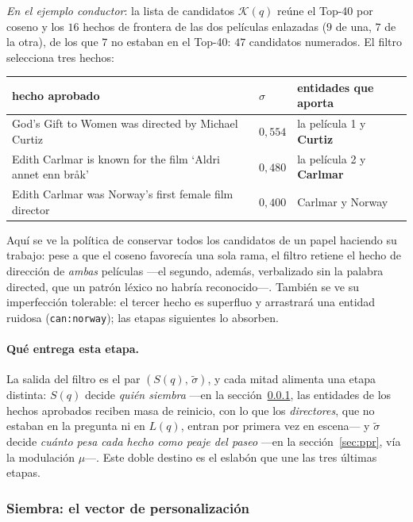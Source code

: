 \documentclass[11pt,a4paper]{article}
\begin{document}
\emph{En el ejemplo conductor}: la lista de candidatos $\mathcal{K}(q)$
reúne el Top-40 por coseno y los $16$ hechos de frontera de las dos
películas enlazadas ($9$ de una, $7$ de la otra), de los que $7$ no
estaban en el Top-40: $47$ candidatos numerados. El filtro selecciona
tres hechos:
\begin{center}\small
\begin{tabular}{lll}
\toprule
hecho aprobado & $\sigma$ & entidades que aporta\\
\midrule
\guillemotleft{}God's Gift to Women was directed by Michael Curtiz\guillemotright{} & $0{,}554$ &
  la película 1 y \textbf{Curtiz}\\
\guillemotleft{}Edith Carlmar is known for the film `Aldri annet enn bråk'\guillemotright{} &
  $0{,}480$ & la película 2 y \textbf{Carlmar}\\
\guillemotleft{}Edith Carlmar was Norway's first female film director\guillemotright{} &
  $0{,}400$ & Carlmar y Norway\\
\bottomrule
\end{tabular}
\end{center}
Aquí se ve la política de \guillemotleft{}conservar todos los candidatos de un
papel\guillemotright{} haciendo su trabajo: pese a que el coseno favorecía una sola rama,
el filtro retiene el hecho de dirección de \emph{ambas} películas ---el
segundo, además, verbalizado sin la palabra \guillemotleft{}directed\guillemotright{}, que un patrón
léxico no habría reconocido---. También se ve su imperfección tolerable:
el tercer hecho es superfluo y arrastrará una entidad ruidosa
(\texttt{can:norway}); las etapas siguientes lo absorben.

\paragraph{Qué entrega esta etapa.}
La salida del filtro es el par $(S(q),\,\tilde\sigma)$, y cada mitad
alimenta una etapa distinta: $S(q)$ decide \emph{quién siembra} ---en la
sección~\ref{sec:siembra}, las entidades de los hechos aprobados reciben
masa de reinicio, con lo que los \emph{directores}, que no estaban en la
pregunta ni en $L(q)$, entran por primera vez en escena--- y
$\tilde\sigma$ decide \emph{cuánto pesa cada hecho como peaje del paseo}
---en la sección~\ref{sec:ppr}, vía la modulación $\mu$---. Este doble
destino es el eslabón que une las tres últimas etapas.

\subsubsection{Siembra: el vector de personalización}
\label{sec:siembra}
\end{document}
